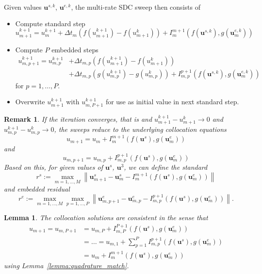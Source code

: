 \documentclass{article}
\newtheorem{remark}{Remark}
\newtheorem{lemma}{Lemma}
\newcommand{\ve}[1]{\mathbf{#1}}
\begin{document}
Given values $\ve{u}^{s,k}$, $\ve{u}^{e,k}$, the multi-rate SDC sweep then consists of
\begin{itemize}
\item Compute standard step
	\begin{equation}
		u^{k+1}_{m+1} = u^{k+1}_{m} + \Delta t_m \left( f(u^{k+1}_{m+1}) - f(u^k_{m+1}) \right) + I_{m}^{m+1} \left( f(\ve{u}^{s,k}) , g(\ve{u}^{e,k}_m) \right)
	\end{equation}
\item Compute $P$ embedded steps
	\begin{align*}
		u_{m,p+1}^{k+1} = u_{m,p}^{k+1} &+ \Delta t_{m,p} \left( f(u^{k+1}_{m+1}) - f(u^k_{m+1}) \right) \\
			& + \Delta t_{m,p} \left( g(u^{k+1}_{m,p}) - g(u^k_{m,p}) \right) + I_{m,p}^{p+1}  \left( f(\ve{u}^{s,k}) , g(\ve{u}^{e,k}_m) \right)
	\end{align*}
	for $p=1, \ldots, P$.
\item Overwrite $u_{m+1}^{k+1}$ with $u_{m,P+1}^{k+1}$ for use as initial value in next standard step.
\end{itemize}
\begin{remark}
If the iteration converges, that is and $u^{k+1}_{m+1} - u^{k}_{m+1} \to 0$ and $u^{k+1}_{m,p} - u^{k}_{m,p} \to 0$, the sweeps reduce to the underlying collocation equations
\begin{equation}
	u_{m+1} = u_{m} + I_m^{m+1} \left( f(\ve{u}^{s}) , g(\ve{u}^{e}_m) \right)
\end{equation}
and
\begin{equation}
	u_{m,p+1} = u_{m,p} + I_{m,p}^{p+1} \left( f(\ve{u}^{s}) , g(\ve{u}^{e}_m) \right)
\end{equation}
Based on this, for given values of $\ve{u}^s$, $\ve{u}^3$, we can define the standard 
\begin{equation}
 r^s := \max_{m=1,\ldots,M} \left\| \ve{u}^s_{m+1} - \ve{u}^s_{m} - I_{m}^{m+1}\left( f(\ve{u}^{s}) , g(\ve{u}^{e}_m) \right) \right\|
\end{equation}
and embedded residual
\begin{equation}
	r^e := \max_{m=1,\ldots,M} \max_{p=1,\ldots,P} \left\| \ve{u}^e_{m,p+1} - \ve{u}^e_{m,p} - I_{m,p}^{p+1}\left( f(\ve{u}^{s}) , g(\ve{u}^{e}_m) \right) \right\|.
\end{equation}
\end{remark}
\begin{lemma}
The collocation solutions are consistent in the sense that
\begin{align*}
	u_{m+1} = u_{m,P+1} &= u_{m,P} + I_{m,P}^{P+1}\left( f(\ve{u}^{s}) , g(\ve{u}^{e}_m) \right) \\
			&= \ldots = u_{m,1} + \sum_{p=1}^{P} I_{m,p}^{p+1}\left( f(\ve{u}^{s}) , g(\ve{u}^{e}_m) \right) \\
			&= u_{m} + I_{m}^{m+1}\left( f(\ve{u}^{s}) , g(\ve{u}^{e}_m) \right)
\end{align*}
using Lemma~\ref{lemma:quadrature_match}.
\end{lemma}
\end{document}
